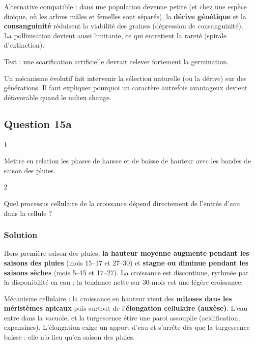 \documentclass[11pt,a4paper]{article}
\begin{document}
Alternative compatible : dans une population devenue petite (et chez une espèce dioïque, où les arbres mâles et femelles sont séparés), la \textbf{dérive génétique} et la \textbf{consanguinité} réduisent la viabilité des graines (dépression de consanguinité). La pollinisation devient aussi limitante, ce qui entretient la rareté (spirale d'extinction).

Test : une scarification artificielle devrait relever fortement la germination.

\begin{methode}

Un mécanisme évolutif fait intervenir la sélection naturelle (ou la dérive) sur des générations. Il faut expliquer pourquoi un caractère autrefois avantageux devient défavorable quand le milieu change.

\end{methode}

\hypertarget{question-15a}{%
\subsection{Question 15a}\label{question-15a}}

\begin{indication}{1}

Mettre en relation les phases de hausse et de baisse de hauteur avec les bandes de saison des pluies.

\end{indication}

\begin{indication}{2}

Quel processus cellulaire de la croissance dépend directement de l'entrée d'eau dans la cellule ?

\end{indication}

\hypertarget{solution-41}{%
\subsubsection{Solution}\label{solution-41}}

Hors première saison des pluies, \textbf{la hauteur moyenne augmente pendant les saisons des pluies} (mois 15--17 et 27--30) et \textbf{stagne ou diminue pendant les saisons sèches} (mois 5--15 et 17--27). La croissance est discontinue, rythmée par la disponibilité en eau ; la tendance nette sur 30 mois est une légère croissance.

Mécanisme cellulaire : la croissance en hauteur vient des \textbf{mitoses dans les méristèmes apicaux} puis surtout de l'\textbf{élongation cellulaire (auxèse)}. L'eau entre dans la vacuole, et la turgescence étire une paroi assouplie (acidification, expansines). L'élongation exige un apport d'eau et s'arrête dès que la turgescence baisse : elle n'a lieu qu'en saison des pluies.
\end{document}
